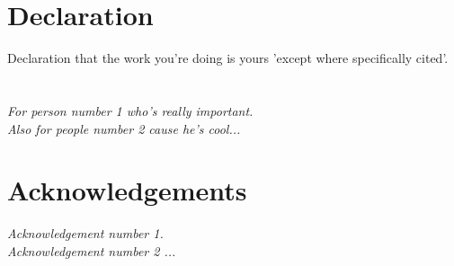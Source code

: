 
\chapter*{Declaration}
Declaration that the work you're doing is yours 'except where specifically cited'.
\newpage
\chapter*{\phantom{Dedications}}
\begin{flushright}
\emph{
For person number 1 who's really important. \bigskip\\
Also for people number 2 cause he's cool... \bigskip\\
}
\end{flushright}
\chapter*{Acknowledgements}
\begin{flushright}
\emph{Acknowledgement number 1. \bigskip\\
Acknowledgement number 2 ...
}
\end{flushright}
